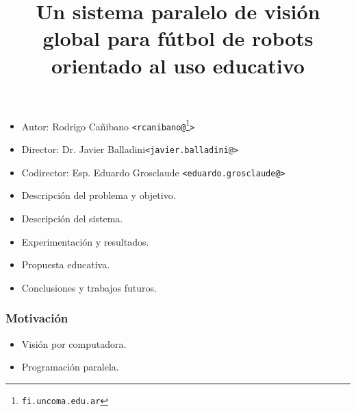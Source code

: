 \documentclass[11pt,a4paper,spanish]{beamer}
\title{Un sistema paralelo de visión global para fútbol de robots
	orientado al uso educativo}
\author{}
\date{}
\begin{document}
\begin{frame}

	\maketitle

\begin{itemize}

	\small

	\item Autor: Rodrigo Cañibano \texttt{<rcanibano@\footnote[1]{fi.uncoma.edu.ar}>}

	\item Director: Dr. Javier Balladini\texttt{<javier.balladini@\footnotemark[1]>}

	\item Codirector: Esp. Eduardo Grosclaude \texttt{<eduardo.grosclaude@\footnotemark[1]>}

\end{itemize}

\end{frame}

\begin{frame}

\begin{itemize}

\item Descripción del problema y objetivo.

\item Descripción del sistema.

\item Experimentación y resultados.

\item Propuesta educativa.

\item Conclusiones y trabajos futuros.

\end{itemize}

\end{frame}

\begin{frame}

\frametitle{Motivación}

\begin{itemize}

\item Visión por computadora.

\item Programación paralela.

\end{itemize}

\end{frame}
\end{document}
